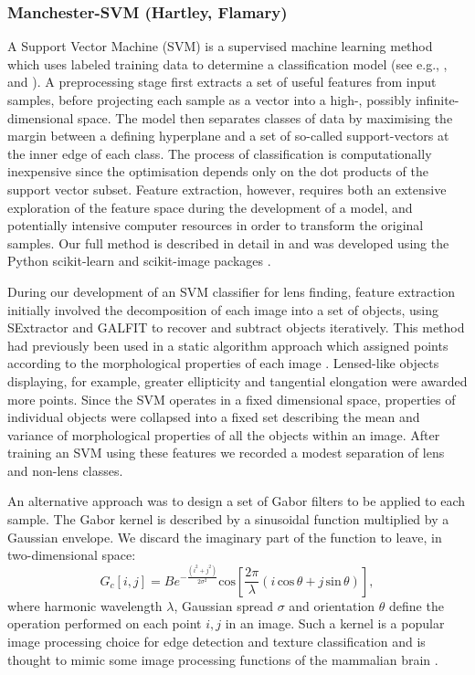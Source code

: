 \documentclass{aa}
\begin{document}
\subsubsection{Manchester-SVM (Hartley, Flamary)}
\label{sec:Gabor-SVM}

A Support Vector Machine (SVM) is a supervised machine learning method which uses labeled training data to determine a classification model (see e.g., \citet{vapnik79estimation}, \citet{Cortes1995} and \citet{Burges1998}). A preprocessing stage first extracts a set of useful features from input samples, before projecting each sample as a vector into a high-, possibly infinite-dimensional space. The model then separates classes of data by maximising the margin between a defining hyperplane and a set of so-called support-vectors at the inner edge of each class. The process of classification is computationally inexpensive since the optimisation depends only on the dot products of the support vector subset. Feature extraction, however,  requires both an extensive exploration of the feature space during the development of a model, and potentially intensive computer resources in order to transform the original samples. Our full method is described in detail in \citet{hartley2017support} and was developed using the Python scikit-learn and scikit-image packages \citep{scikit-learn,scikit-image}.

During our development of an SVM classifier for lens finding, feature extraction initially involved the decomposition of each image into a set of objects, using SExtractor \citep{1996AandAS..117..393B} and GALFIT \citep{2002AJ....124..266P} to recover and subtract objects iteratively. This method had previously been used in a static algorithm approach which assigned points according to the morphological properties of each image \citep[see][]{2014AandA...566A..63J}. Lensed-like objects displaying, for example, greater ellipticity and tangential elongation were awarded more points. Since the SVM operates in a fixed dimensional space,  properties of individual objects were collapsed into a fixed set describing the mean and variance of morphological properties of all the objects within an image. After training an SVM using these features we recorded a modest separation of lens and non-lens classes.

An alternative approach was to design a set of Gabor filters to be applied to each sample. The Gabor kernel is described by a sinusoidal function multiplied by a Gaussian envelope. We discard the imaginary part of the function to leave, in two-dimensional space:
\begin{equation}
G_c[i,j]=Be^{-\frac{(i^2+j^2)}{2\sigma^2}} \mathrm{cos}\left[\frac{2\pi}{\lambda} (i\, \mathrm{cos} \, \theta + j\, \mathrm{sin} \,\theta)\right],
\end{equation}
where harmonic wavelength $\lambda$, Gaussian spread  $\sigma$ and orientation $\theta$ define the operation performed on each point $i,j$ in an image. Such a kernel is a popular image processing choice for edge detection and texture classification \citep[e.g.][]{Springer-verlag97computationalmodels,Feichtinger98a} and is thought to mimic some image processing functions of the mammalian brain \citep{Jones1233}.
\end{document}

